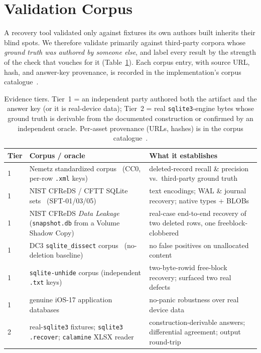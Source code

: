 \documentclass[10pt,a4paper]{article}
\newcommand{\code}[1]{\texttt{#1}}
\begin{document}
\section{Validation Corpus}\label{sec:corpus}

A recovery tool validated only against fixtures its own authors built inherits
their blind spots. We therefore validate primarily against third-party corpora
whose \emph{ground truth was authored by someone else}, and label every result by
the strength of the check that vouches for it (Table~\ref{tab:tiers}). Each corpus
entry, with source URL, hash, and answer-key provenance, is recorded in the
implementation's corpus catalogue~\cite{sqlite4n6}.

\begin{table}[t]
\centering\small
\caption{Evidence tiers. Tier~1 = an independent party authored both the artifact
and the answer key (or it is real-device data); Tier~2 = real \code{sqlite3}-engine
bytes whose ground truth is derivable from the documented construction or confirmed
by an independent oracle. Per-asset provenance (URLs, hashes) is in the corpus
catalogue~\cite{sqlite4n6}.}
\label{tab:tiers}
\begin{tabular}{@{}l p{} p{}@{}}
\toprule
Tier & Corpus / oracle & What it establishes \\
\midrule
1 & Nemetz standardized corpus~\cite{nemetz2018corpus} (CC0, per-row \code{.xml} keys) & deleted-record recall \& precision vs.\ third-party ground truth \\
1 & NIST CFReDS / CFTT SQLite sets~\cite{nist_cfreds_sqlite} (SFT-01/03/05) & text encodings; WAL \& journal recovery; native types + BLOBs \\
1 & NIST CFReDS \emph{Data Leakage} (\code{snapshot.db} from a Volume Shadow Copy)~\cite{nist_cfreds_sqlite} & real-case end-to-end recovery of two deleted rows, one freeblock-clobbered \\
1 & DC3 \code{sqlite\_dissect} corpus~\cite{sqlite_dissect_dc3} (no-deletion baseline) & no false positives on unallocated content \\
1 & \code{sqlite-unhide} corpus (independent \code{.txt} keys)~\cite{sqlite4n6} & two-byte-rowid free-block recovery; surfaced two real defects \\
1 & genuine iOS-17 application databases~\cite{sqlite4n6} & no-panic robustness over real device data \\
2 & real-\code{sqlite3} fixtures; \code{sqlite3 .recover}; \code{calamine} XLSX reader & construction-derivable answers; differential agreement; output round-trip \\
\bottomrule
\end{tabular}
\end{table}
\end{document}
